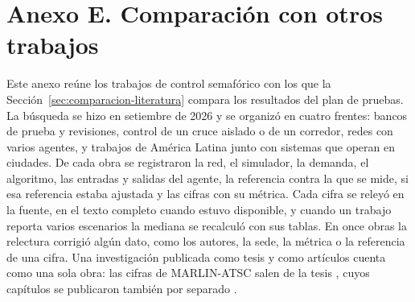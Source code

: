 \section*{Anexo E. Comparación con otros trabajos}
{}
\makeatletter{}\makeatother
\label{anx:trabajos}
\setcounter{table}{0}
\renewcommand{\thetable}{E.\arabic{table}}
\renewcommand{\theHtable}{E.\arabic{table}}

Este anexo reúne los trabajos de control semafórico con los que la
Sección~\ref{sec:comparacion-literatura} compara los resultados del plan
de pruebas. La búsqueda se hizo en setiembre de 2026 y se organizó en
cuatro frentes: bancos de prueba y revisiones, control de un cruce
aislado o de un corredor, redes con varios agentes, y trabajos de
América Latina junto con sistemas que operan en ciudades. De cada obra
se registraron la red, el simulador, la demanda, el algoritmo, las
entradas y salidas del agente, la referencia contra la que se mide, si
esa referencia estaba ajustada y las cifras con su métrica. Cada cifra
se releyó en la fuente, en el texto completo cuando estuvo disponible,
y cuando un trabajo reporta varios escenarios la mediana se recalculó
con sus tablas. En once obras la relectura corrigió algún dato, como
los autores, la sede, la métrica o la referencia de una cifra. Una
investigación publicada como tesis y como artículos cuenta como una sola
obra: las cifras de MARLIN-ATSC salen de la tesis
\citep{ElTantawy2012_Tesis}, cuyos capítulos se publicaron también por
separado \citep{ElTantawy2012_ITSC,ElTantawy2014_Parametros,ElTantawy2013_MARLIN}.

